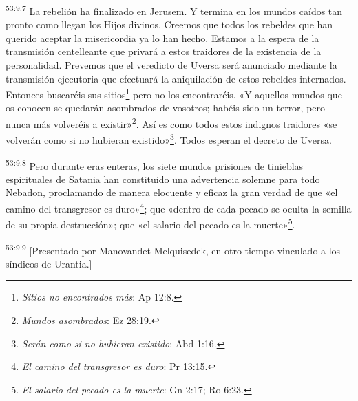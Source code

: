 \par
\textsuperscript{53:9.7} La rebelión ha finalizado en Jerusem. Y termina en los mundos caídos tan pronto como llegan los Hijos divinos. Creemos que todos los rebeldes que han querido aceptar la misericordia ya lo han hecho. Estamos a la espera de la transmisión centelleante que privará a estos traidores de la existencia de la personalidad. Prevemos que el veredicto de Uversa será anunciado mediante la transmisión ejecutoria que efectuará la aniquilación de estos rebeldes internados. Entonces buscaréis sus sitios\footnote{\textit{Sitios no encontrados más}: Ap 12:8.} pero no los encontraréis. «Y aquellos mundos que os conocen se quedarán asombrados de vosotros; habéis sido un terror, pero nunca más volveréis a existir»\footnote{\textit{Mundos asombrados}: Ez 28:19.}. Así es como todos estos indignos traidores «se volverán como si no hubieran existido»\footnote{\textit{Serán como si no hubieran existido}: Abd 1:16.}. Todos esperan el decreto de Uversa.

\par
\textsuperscript{53:9.8} Pero durante eras enteras, los siete mundos prisiones de tinieblas espirituales de Satania han constituido una advertencia solemne para todo Nebadon, proclamando de manera elocuente y eficaz la gran verdad de que «el camino del transgresor es duro»\footnote{\textit{El camino del transgresor es duro}: Pr 13:15.}; que «dentro de cada pecado se oculta la semilla de su propia destrucción»; que «el salario del pecado es la muerte»\footnote{\textit{El salario del pecado es la muerte}: Gn 2:17; Ro 6:23.}.

\par
\textsuperscript{53:9.9} [Presentado por Manovandet Melquisedek, en otro tiempo vinculado a los síndicos de Urantia.]